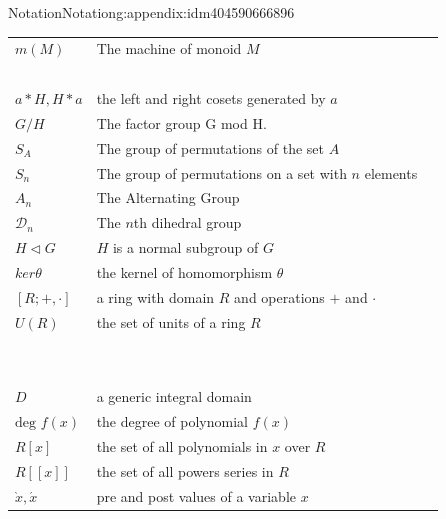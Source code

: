 \documentclass[twoside,10pt,]{book}
\numberwithin{equation}{section}
\begin{document}
\begin{appendixptx}{Notation}{}{Notation}{}{}{g:appendix:idm404590666896}
\begin{longtable}[l]{lp{}r}
\(m(M)\)&The machine of monoid \(M\)&\pageref{g:notation:idm404599570048}\\
\(\)&&\pageref{g:notation:idm404599517328}\\
\(a*H, H*a\)&the left and right cosets generated by \(a\)&\pageref{g:notation:idm404599206864}\\
\(G/H\)&The factor group G mod H.&\pageref{g:notation:idm404599324656}\\
\(S_A\)&The group of permutations of the set \(A\)&\pageref{g:notation:idm404599890928}\\
\(S_n\)&The group of permutations on a set with \(n\) elements&\pageref{g:notation:idm404599889936}\\
\(A_n\)&The Alternating Group&\pageref{g:notation:idm404599813456}\\
\(\mathcal{D}_n\)&The \(n\)th dihedral group&\pageref{g:notation:idm404599673616}\\
\(H \triangleleft  G\)&\(H\) is a normal subgroup of \(G\)&\pageref{g:notation:idm404598295840}\\
\(ker \theta\)&the kernel of homomorphism \(\theta\)&\pageref{g:notation:idm404598206048}\\
\([R; +, \cdot]\)&a ring with domain \(R\) and operations \(+\) and \(\cdot\)&\pageref{g:notation:idm404591659744}\\
\(U(R)\)&the set of units of a ring \(R\)&\pageref{g:notation:idm404591603952}\\
\(\)&&\pageref{g:notation:idm404591583744}\\
\(\)&&\pageref{g:notation:idm404591522176}\\
\(D\)&a generic integral domain&\pageref{g:notation:idm404591497312}\\
\(\textrm{deg }f(x)\)&the degree of polynomial \(f(x)\)&\pageref{g:notation:idm404591254400}\\
\(R[x]\)&the set of all polynomials in \(x\) over \(R\)&\pageref{g:notation:idm404591253936}\\
\(R[[x]]\)&the set of all powers series in \(R\)&\pageref{g:notation:idm404590864592}\\
\(\grave x,  \acute x\)&pre and post values of a variable \(x\)&\pageref{g:notation:idm404590692704}\\
\end{longtable}
\end{appendixptx}
%
\backmatter
%
%
%
\typeout{************************************************}
\typeout{************************************************}
\end{document}
